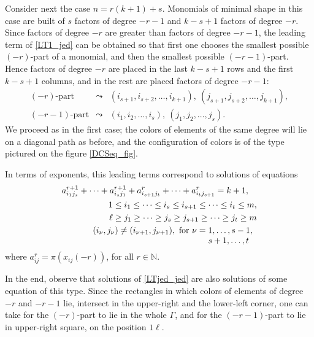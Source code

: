 \documentclass[a4paper, 10pt,oneside]{amsart}
\begin{document}
Consider next the case $n=r(k+1)+s$. Monomials of minimal shape in this
case are built of $s$ factors of degree $-r-1$ and $k-s+1$ factors
of degree $-r$. Since factors of degree $-r$ are greater than
factors of degree $-r-1$, the leading term of \eqref{LT1_jed} can be
obtained so that first one chooses the smallest possible $(-r)$-part
of a monomial, and then the smallest possible $(-r-1)$-part. Hence
factors of degree $-r$ are placed in the last $k-s+1$ rows and the
first $k-s+1$ columns, and in the rest are placed factors of degree
$-r-1$:
\begin{eqnarray*}
(-r)\textrm{-part} & \leadsto & (i_{s+1}, i_{s+2}, \dots, i_{k+1}),\ (j_{s+1}, j_{s+2}, \dots, j_{k+1}), \\
 (-r-1)\textrm{-part} & \leadsto & (i_1, i_2, \dots, i_s),\ (j_1, j_2, \dots, j_s).
\end{eqnarray*}
We proceed as in the first case; the colors of elements of the same
degree will lie on a diagonal path as before, and the configuration of colors
is of the type pictured on the figure \ref{DCSeq_fig}.

In terms of exponents, this leading terms correspond to solutions of
equations
\begin{eqnarray*}
a_{i_1 j_s}^{r+1}+ \dots +a_{i_s j_1}^{r+1}+a_{i_{s+1} j_t}^r+ \dots
+a_{i_t j_{s+1}}^r
= k+1, & & \\
& & \hspace{-58ex} 1\leq i_1 \leq\dots\leq i_s\leq i_{s+1} \leq\dots\leq i_t\leq m, \\
& & \hspace{-58ex}  \ell\geq j_1 \geq\dots\geq j_s \geq j_{s+1}\geq\dots\geq j_t\geq m\\
& & \hspace{-58ex}  (i_\nu,j_\nu)\neq (i_{\nu+1},j_{\nu+1}),\textrm{
for }
\nu=\begin{minipage}[t]{2cm}$1,\dots,s-1,$\\$s+1,\dots,t$\end{minipage}
\end{eqnarray*}
where $a_{ij}^r=\pi(x_{ij}(-r))$, for all $r\in{{\mathbb N}}$.

In the end, observe that solutions of \eqref{LTjed_jed} are also
solutions of some equation of this type. Since the rectangles in which
colors of elements of degree $-r$ and $-r-1$ lie, intersect in
the upper-right and the lower-left corner, one can take for the
$(-r)$-part to lie in the whole $\Gamma$, and for the $(-r-1)$-part
to lie in upper-right square, on the position $1\ell$.
\end{document}
